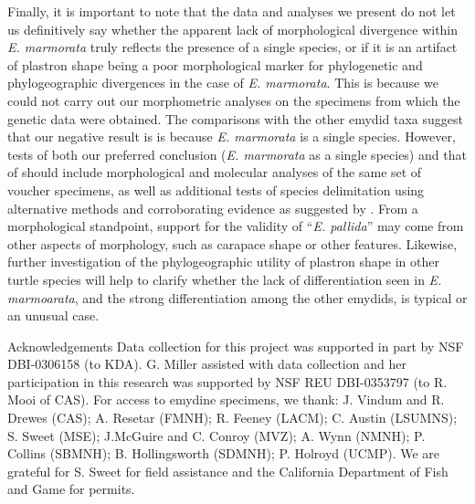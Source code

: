 \documentclass[12pt,letterpaper]{article}
\renewcommand{\section}[1]{%
\bigskip
\begin{center}
\begin{Large}
\normalfont\scshape #1
\medskip
\end{Large}
\end{center}}
\begin{document}
Finally, it is important to note that the data and analyses we present do not let us definitively say whether the apparent lack of morphological divergence within \textit{E. marmorata} truly reflects the presence of a single species, or if it is an artifact of plastron shape being a poor morphological marker for phylogenetic and phylogeographic divergences in the case of \textit{E. marmorata}. This is because we could not carry out our morphometric analyses on the specimens from which the genetic data were obtained. The comparisons with the other emydid taxa suggest that our negative result is is because \textit{E. marmorata} is a single species. However, tests of both our preferred conclusion (\textit{E. marmorata} as a single species) and that of \citet{Spinks2014} should include morphological and molecular analyses of the same set of voucher specimens, as well as additional tests of species delimitation using alternative methods and corroborating evidence as suggested by \citet{Carstens2013}. From a morphological standpoint, support for the validity of ``\textit{E. pallida}'' may come from other aspects of morphology, such as carapace shape or other features. Likewise, further investigation of the phylogeographic utility of plastron shape in other turtle species will help to clarify whether the lack of differentiation seen in \textit{E. marmoarata}, and the strong differentiation among the other emydids, is typical or an unusual case.


\section*{Acknowledgements}
Data collection for this project was supported in part by NSF DBI-0306158 (to KDA). G. Miller assisted with data collection and her participation in this research was supported by NSF REU DBI-0353797 (to R. Mooi of CAS). For access to emydine specimens, we thank: J. Vindum and R. Drewes (CAS); A. Resetar (FMNH); R. Feeney (LACM); C. Austin (LSUMNS); S. Sweet (MSE); J.McGuire and C. Conroy (MVZ); A. Wynn (NMNH); P. Collins (SBMNH); B. Hollingsworth (SDMNH); P. Holroyd (UCMP). We are grateful for S. Sweet for field assistance and the California Department of Fish and Game for permits.



\end{document}
